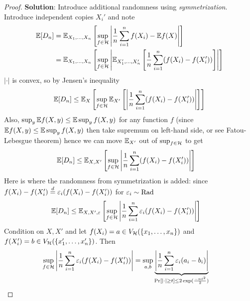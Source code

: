 \begin{proof}
    \textbf{Solution}: Introduce additional randomness using \emph{symmetrization}.
    Introduce independent copies $X_i'$ and note
    \begin{align}
        \mathbb{E}[D_n] &= \mathbb{E}_{X_1, \ldots, X_n}\left[\sup_{f \in \mathcal{H}} \left\lvert
            \frac{1}{n} \sum_{i=1}^n f(X_i) - \mathbb{E} f(X)
        \right\rvert \right] \\
        &= \mathbb{E}_{X_1, \ldots, X_n} \left[ \sup_{f \in \mathcal{H}} \left\lvert \mathbb{E}_{X_1', \ldots, X_n'} \left[
            \frac{1}{n} \sum_{i=1}^n (f(X_i) - f(X_i'))
        \right]\right\rvert\right]
    \end{align}
    $\lvert \cdot \rvert$ is convex, so by Jensen's inequality
    \begin{align}
        \mathbb{E}[D_n]
        \leq \mathbb{E}_{X} \left[ \sup_{f \in \mathcal{H}} \mathbb{E}_{X'} \left[\left\lvert
            \frac{1}{n} \sum_{i=1}^n (f(X_i) - f(X_i'))
        \right\rvert \right]\right]
    \end{align}
    Also, $\sup_y \mathbb{E} f(X,y) \leq \mathbb{E} \sup_y f(X,y)$ for any function $f$
    (since $\mathbb{E} f(X,y) \leq \mathbb{E} \sup_y f(X,y)$ then take supremum on left-hand side, or see Fatou-Lebesgue theorem)
    hence we can move $\mathbb{E}_{X'}$ out of $\sup_{f \in \mathcal{H}}$ to get
    \begin{align}
        \mathbb{E}[D_n]
        &\leq \mathbb{E}_{X, X'}\left[
        \sup_{f \in \mathcal{H}} \left\lvert \frac{1}{n} \sum_{i=1}^n ( f(X_i) - f(X_i') )
        \right\rvert\right]
    \end{align}
    Here is where the randomness from symmetrization is added:
    since $f(X_i) - f(X_i') \overset{d}{=} \varepsilon_i(f(X_i) - f(X_i'))$ for $\varepsilon_i \sim \text{Rad}$
    \begin{align}
        \mathbb{E}[D_n]
        &\leq \mathbb{E}_{X, X', \varepsilon}\left[
        \sup_{f \in \mathcal{H}} \left\lvert \frac{1}{n} \sum_{i=1}^n \varepsilon_i ( f(X_i) - f(X_i') )
        \right\rvert\right] \label{eq:9-10-symmetrized-need-concentration}
    \end{align}
    Condition on $X, X'$ and let $f(X_i) = a \in V_{\mathcal{H}}(\{x_1, \ldots, x_n\})$
    and $f(X_i') = b \in V_{\mathcal{H}}(\{x_1', \ldots, x_n'\})$. Then
    \begin{align}
        \sup_{f \in \mathcal{H}}
            \left\lvert \frac{1}{n} \sum_{i=1}^n \varepsilon_i(f(X_i) - f(X_i')) \right\rvert
        &= \sup_{a, b}
            \underbrace{
                \left\lvert \frac{1}{n} \sum_{i=1}^n \varepsilon_i (a_i - b_i)\right\rvert
            }_{\Pr[\lvert \cdot \rvert \geq t] \leq 2 \exp(\frac{-n t^2}{2})}
    \end{align}

\end{proof}
